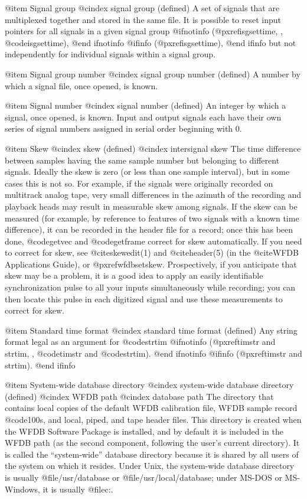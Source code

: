 {{{{{{{{@item Signal group
@cindex signal group (defined)
A set of signals that are multiplexed together and stored in the same
file.  It is possible to reset input pointers for all signals in a
given signal group
@ifnotinfo
(@pxref{isgsettime, , @code{isgsettime}}),
@end ifnotinfo
@ifinfo
(@pxref{isgsettime}),
@end ifinfo
but not independently for individual signals within a signal group.

@item Signal group number
@cindex signal group number (defined)
A number by which a signal file, once opened, is known.

@item Signal number
@cindex signal number (defined)
An integer by which a signal, once opened, is known.  Input and output
signals each have their own series of signal numbers assigned in serial
order beginning with 0.

@item Skew
@cindex skew (defined)
@cindex intersignal skew
The time difference between samples having the same sample number but
belonging to different signals.  Ideally the skew is zero (or less than
one sample interval), but in some cases this is not so. For example, if
the signals were originally recorded on multitrack analog tape, very
small differences in the azimuth of the recording and playback heads may
result in measurable skew among signals.  If the skew can be measured
(for example, by reference to features of two signals with a known time
difference), it can be recorded in the header file for a record;
once this has been done, @code{getvec} and @code{getframe} correct for
skew automatically.  If you need to correct for skew, see
@cite{skewedit(1)} and @cite{header(5)} (in the @cite{WFDB
Applications Guide}), or @pxref{wfdbsetskew}.  Prospectively, if you
anticipate that skew may be a problem, it is a good idea to apply an
easily identifiable synchronization pulse to all your inputs
simultaneously while recording;  you can then locate this pulse in
each digitized signal and use these measurements to correct for skew.

@item Standard time format
@cindex standard time format (defined)
Any string format legal as an argument for @code{strtim}
@ifnotinfo
(@pxref{timstr and strtim, , @code{timstr} and @code{strtim}}).
@end ifnotinfo
@ifinfo
(@pxref{timstr and strtim}).
@end ifinfo

@item System-wide database directory
@cindex system-wide database directory (defined)
@cindex WFDB path
@cindex database path
The directory that contains local copies of the default WFDB calibration file,
WFDB sample record @code{100s}, and local, piped, and tape header files.
This directory is created when the WFDB Software Package is installed, and
by default it is included in the WFDB path (as the second component, following
the user's current directory).  It is called the ``system-wide'' database
directory because it is shared by all users of the system on which it resides.
Under Unix, the system-wide database directory is usually @file{/usr/database}
or @file{/usr/local/database};  under MS-DOS or MS-Windows, it is usually
@file{c:\database}.

}}}}}}}}
